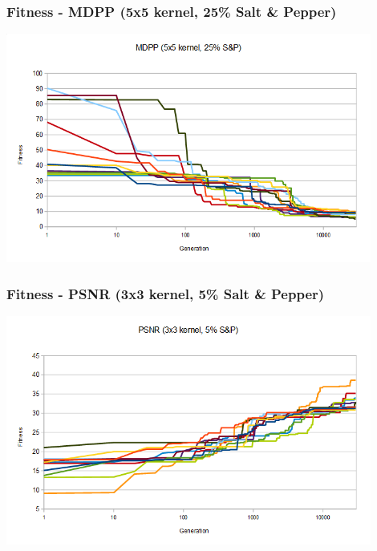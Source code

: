 \documentclass{beamer}
\begin{document}

	\begin{frame}[t,fragile]
	\frametitle{Fitness - MDPP (5x5 kernel, 25\% Salt \& Pepper)}					
	\begin{center}
	\includegraphics[width=0.9\textwidth]{img/mdpp_5x5_25sp.png}
	
	\end{center}
	\end{frame}
	

	\begin{frame}[t,fragile]
	\frametitle{Fitness - PSNR (3x3 kernel, 5\% Salt \& Pepper)}					
	\begin{center}
	\includegraphics[width=0.9\textwidth]{img/psnr_3x3_5sp.png}
	
	\end{center}
	\end{frame}
	
\end{document}
